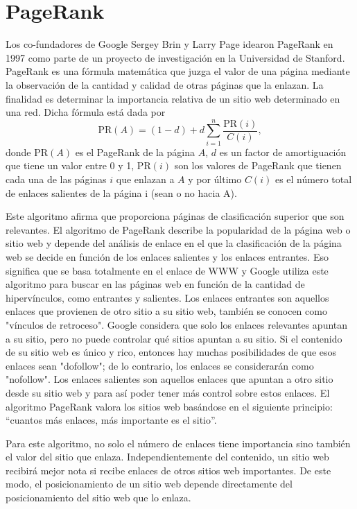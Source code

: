 \documentclass[11pt]{article}
\begin{document}
\section{PageRank}
Los co-fundadores de Google Sergey Brin y Larry Page idearon PageRank en 1997 como parte de un proyecto de investigación en la Universidad de Stanford. PageRank  es una fórmula matemática que juzga el valor de una página mediante la observación de la cantidad y calidad de otras páginas que la enlazan. La finalidad es determinar la importancia relativa de un sitio web determinado en una red. Dicha fórmula está dada por
{\selectfont $$ \text{PR} (A) = (1-d)+d\sum_{i=1}^n \frac{\text{PR}(i)}{C(i)}, $$}
donde {\selectfont $ \text{PR} (A)$} es el PageRank de la página $A$, $d$ es un factor de amortiguación que tiene un valor entre 0 y 1, {\selectfont $ \text{PR} (i)$} son los valores de PageRank que tienen cada una de las páginas $i$ que enlazan a $A$ y por último $C(i)$ es el número total de enlaces salientes de la página i (sean o no hacia A). \par \vspace{0.3cm}
Este algoritmo afirma que proporciona páginas de clasificación superior que son relevantes. El algoritmo de PageRank describe la popularidad de la página web o sitio web y depende del análisis de enlace en el que la clasificación de la página web se decide en función de los enlaces salientes y los enlaces entrantes. Eso significa que se basa totalmente en el enlace de WWW y Google utiliza este algoritmo para buscar en las páginas web en función de la cantidad de hipervínculos, como entrantes y salientes. 
Los enlaces entrantes son aquellos enlaces que provienen de otro sitio a su sitio web, también se conocen como "vínculos de retroceso". Google considera que solo los enlaces relevantes apuntan a su sitio, pero no puede controlar qué sitios apuntan a su sitio. Si el contenido de su sitio web es único y rico, entonces hay muchas posibilidades de que esos enlaces sean "dofollow"; de lo contrario, los enlaces se considerarán como "nofollow".
Los enlaces salientes son aquellos enlaces que apuntan a otro sitio desde su sitio web y para así poder tener más control sobre estos enlaces.
El algoritmo PageRank valora los sitios web basándose en el siguiente principio: “cuantos más enlaces, más importante es el sitio”. \par \vspace{0.3cm}
 Para este algoritmo, no solo el número de enlaces tiene importancia sino también el valor del sitio que enlaza. Independientemente del contenido, un sitio web recibirá mejor nota si recibe enlaces de otros sitios web importantes. De este modo, el posicionamiento de un sitio web depende directamente del posicionamiento del sitio web que lo enlaza.
\end{document}
